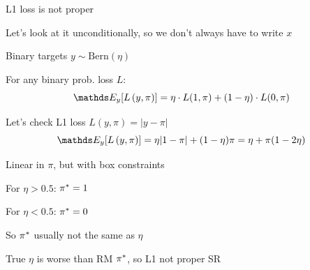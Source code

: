 \documentclass[11pt,compress,t,notes=noshow, xcolor=table]{beamer}
\providecommand{\Lpiy}{L\left(y, \pi\right)} %
\begin{document}
\begin{framei}[sep=M]{L1 loss is not proper}


\item Let's look at it unconditionally, so we don't always have to write $x$
    
\item Binary targets $y \sim \text{Bern}(\eta)$ %


\item For any binary prob. loss $L$:
$$\E_{y}[\Lpiy]=\eta \cdot L(1, \pi) + (1-\eta) \cdot L(0, \pi)$$

\item Let's check L1 loss $\Lpiy=|y-\pi|$
$$\E_y[\Lpiy]=\eta |1-\pi| + (1-\eta) \pi = \eta+\pi(1-2\eta)$$

\item Linear in $\pi$, but with box constraints


\item For $\eta > 0.5$: $\pi^{\ast} =1$ 

\item For $\eta < 0.5$: $\pi^{\ast} = 0$

\item So $\pi^{\ast}$ usually not the same as $\eta$

\item True $\eta$ is worse than RM $\pi^{\ast}$, so L1 not proper SR


\end{framei}
\end{document}
